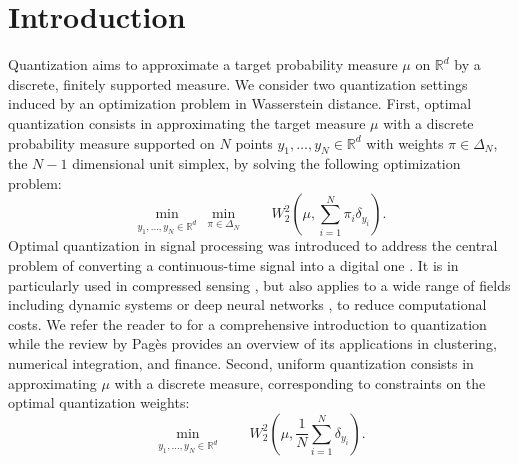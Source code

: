 \documentclass[11pt]{article}
\newcommand{\R}{\mathbb R}
\newcommand{\1}{\mathbbm{1}}
\numberwithin{equation}{section}
\begin{document}
\section{Introduction}
Quantization aims to approximate a target probability measure $\mu$ on $\R^d$ by a discrete, finitely supported measure. We consider two quantization settings induced by an optimization problem in Wasserstein distance. 
First, optimal quantization consists in approximating the target measure $\mu$ with a discrete probability measure supported on $N$ points $y_{1},\ldots,y_{N}\in \mathbb{R}^{d}$ with weights $\pi\in\Delta_N$, the $N-1$ dimensional unit simplex, by solving the following optimization problem:
\begin{equation}\label{opt_quant_0}
   \underset{y_1,\ldots,y_N\in \mathbb{R}^{d}}{\min} \ \underset{\pi \in \Delta_{N}}{\min} \qquad W_{2}^{2}\left(\mu,\sum_{i=1}^{N} \pi_{i} \delta_{y_{i}}\right).
\end{equation}
Optimal quantization in signal processing was introduced to address the central problem of converting a continuous-time signal into a digital one \cite{ref_signal_opt_quant_2}. It is in particularly used in compressed sensing \cite{ref_signal_opt_quant,ref_signal_opt_quant_3}, but also applies to a wide range of fields including dynamic systems \cite{larson1967optimum} or deep neural networks \cite{zhou2018adaptive}, to reduce computational costs. We refer the reader to \cite{Bookquantization} for a comprehensive introduction to quantization while the review \cite{pages2015introduction} by Pagès provides an overview of its applications in clustering, numerical integration, and finance. Second, uniform quantization consists in approximating $\mu$ with a discrete measure, corresponding to constraints on the optimal quantization weights: 
\begin{equation}
	\label{eq:unif_quantization_0}
	\underset{y_1,\ldots,y_N\in \mathbb{R}^{d}}{\min} \qquad W_{2}^{2}\left(\mu,\frac{1}{N}\sum_{i=1}^{N} \delta_{y_{i}}\right).
\end{equation}
\end{document}
